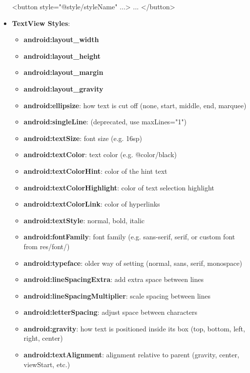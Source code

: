 \documentclass{report}
\begin{document}
\begin{itemize}
            \bigbreak \noindent 
            \begin{xmlcode}
            <button style="@style/styleName" ...> ... </button> 
            \end{xmlcode}
        \item \textbf{TextView Styles}:
            \begin{itemize}
                \item \textbf{android:layout\_width}
                \item \textbf{android:layout\_height}
                \item \textbf{android:layout\_margin}
                \item \textbf{android:layout\_gravity}
                \item \textbf{android:ellipsize}: how text is cut off (none, start, middle, end, marquee)
                \item \textbf{android:singleLine}: (deprecated, use maxLines="1")
                \item \textbf{android:textSize}: font size (e.g. 16sp)
                \item \textbf{android:textColor}: text color (e.g. @color/black)
                \item \textbf{android:textColorHint}: color of the hint text
                \item \textbf{android:textColorHighlight}: color of text selection highlight
                \item \textbf{android:textColorLink}: color of hyperlinks
                \item \textbf{android:textStyle}: normal, bold, italic
                \item \textbf{android:fontFamily}: font family (e.g. sans-serif, serif, or custom font from res/font/)
                \item \textbf{android:typeface}: older way of setting (normal, sans, serif, monospace)
                \item \textbf{android:lineSpacingExtra}: add extra space between lines
                \item \textbf{android:lineSpacingMultiplier}: scale spacing between lines
                \item \textbf{android:letterSpacing}: adjust space between characters
                \item \textbf{android:gravity}: how text is positioned inside its box (top, bottom, left, right, center)
                \item \textbf{android:textAlignment}: alignment relative to parent (gravity, center, viewStart, etc.)

\end{itemize}
\end{itemize}
\end{document}
